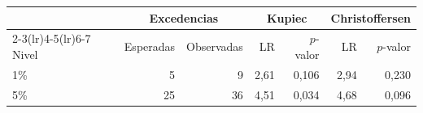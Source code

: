 \begin{tabular}{lrrrrrr}
\toprule
 & \multicolumn{2}{c}{Excedencias} & \multicolumn{2}{c}{Kupiec} & \multicolumn{2}{c}{Christoffersen} \\
\cmidrule(lr){2-3}\cmidrule(lr){4-5}\cmidrule(lr){6-7}
Nivel & Esperadas & Observadas & LR & $p$-valor & LR & $p$-valor \\
\midrule
1\% & 5 & 9 & 2{,}61 & 0{,}106 & 2{,}94 & 0{,}230 \\
5\% & 25 & 36 & 4{,}51 & 0{,}034 & 4{,}68 & 0{,}096 \\
\bottomrule
\end{tabular}
